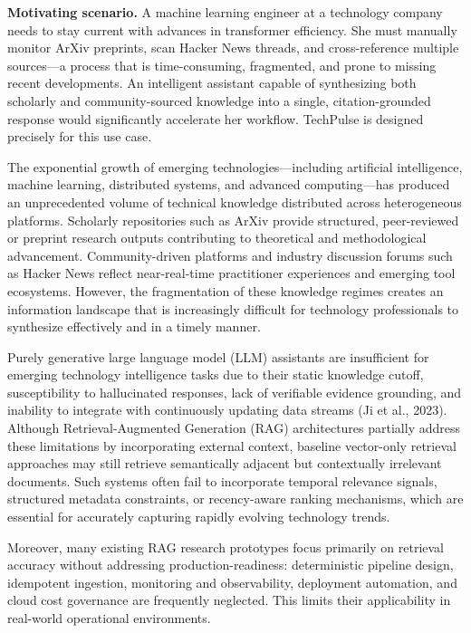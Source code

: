 \documentclass[12pt,a4paper]{report}
\begin{document}
\textbf{Motivating scenario.} A machine learning engineer at a technology company needs to stay current with advances in transformer efficiency. She must manually monitor ArXiv preprints, scan Hacker News threads, and cross-reference multiple sources—a process that is time-consuming, fragmented, and prone to missing recent developments. An intelligent assistant capable of synthesizing both scholarly and community-sourced knowledge into a single, citation-grounded response would significantly accelerate her workflow. TechPulse is designed precisely for this use case.

The exponential growth of emerging technologies—including artificial intelligence, machine learning, distributed systems, and advanced computing—has produced an unprecedented volume of technical knowledge distributed across heterogeneous platforms. Scholarly repositories such as ArXiv provide structured, peer-reviewed or preprint research outputs contributing to theoretical and methodological advancement. Community-driven platforms and industry discussion forums such as Hacker News reflect near-real-time practitioner experiences and emerging tool ecosystems. However, the fragmentation of these knowledge regimes creates an information landscape that is increasingly difficult for technology professionals to synthesize effectively and in a timely manner.

Purely generative large language model (LLM) assistants are insufficient for emerging technology intelligence tasks due to their static knowledge cutoff, susceptibility to hallucinated responses, lack of verifiable evidence grounding, and inability to integrate with continuously updating data streams (Ji et al., 2023). Although Retrieval-Augmented Generation (RAG) architectures partially address these limitations by incorporating external context, baseline vector-only retrieval approaches may still retrieve semantically adjacent but contextually irrelevant documents. Such systems often fail to incorporate temporal relevance signals, structured metadata constraints, or recency-aware ranking mechanisms, which are essential for accurately capturing rapidly evolving technology trends.

Moreover, many existing RAG research prototypes focus primarily on retrieval accuracy without addressing production-readiness: deterministic pipeline design, idempotent ingestion, monitoring and observability, deployment automation, and cloud cost governance are frequently neglected. This limits their applicability in real-world operational environments.
\end{document}
